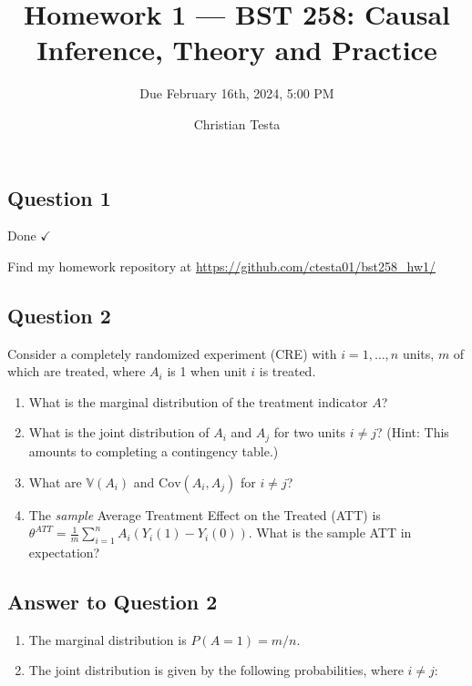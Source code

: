 \documentclass[
  letterpaper,
  DIV=11,
  numbers=noendperiod]{scrartcl}
\title{Homework 1 --- BST 258: Causal Inference, Theory and Practice}
\subtitle{Due February 16th, 2024, 5:00 PM}
\author{Christian Testa}
\date{}
\providecommand{\tightlist}{%
  \setlength{\itemsep}{0pt}\setlength{\parskip}{0pt}}\usepackage{longtable,booktabs,array}
\newcommand{\V}{\mathbb{V}}
\begin{document}
\maketitle
\ifdefined\Shaded\renewenvironment{Shaded}{\begin{tcolorbox}[sharp corners, breakable, borderline west={3pt}{0pt}{shadecolor}, boxrule=0pt, interior hidden, enhanced, frame hidden]}{\end{tcolorbox}}\fi

\hypertarget{question-1}{%
\subsection{Question 1}\label{question-1}}

Done \(\checkmark\)

Find my homework repository at
\url{https://github.com/ctesta01/bst258_hw1/}

\hypertarget{question-2}{%
\subsection{Question 2}\label{question-2}}

Consider a completely randomized experiment (CRE) with
\(i = 1, \ldots, n\) units, \(m\) of which are treated, where \(A_i\) is
1 when unit \(i\) is treated.

\begin{enumerate}
\def\labelenumi{\alph{enumi})}
\item
  What is the marginal distribution of the treatment indicator \(A\)?
\item
  What is the joint distribution of \(A_i\) and \(A_j\) for two units
  \(i \neq j\)? (Hint: This amounts to completing a contingency table.)
\item
  What are \(\V(A_i)\) and \(\text{Cov}(A_i, A_j)\) for \(i \neq j\)?
\item
  The \emph{sample} Average Treatment Effect on the Treated (ATT) is
  \(\theta^{ATT} = \frac{1}{m} \sum_{i=1}^{n} A_i(Y_i(1) - Y_i(0))\).
  What is the sample ATT in expectation?
\end{enumerate}

\hypertarget{answer-to-question-2}{%
\subsection{Answer to Question 2}\label{answer-to-question-2}}

\begin{enumerate}
\def\labelenumi{\alph{enumi})}
\tightlist
\item
  The marginal distribution is \(P(A = 1) = m/n\).
\item
  The joint distribution is given by the following probabilities, where
  \(i \neq j\):
\end{enumerate}
\end{document}
